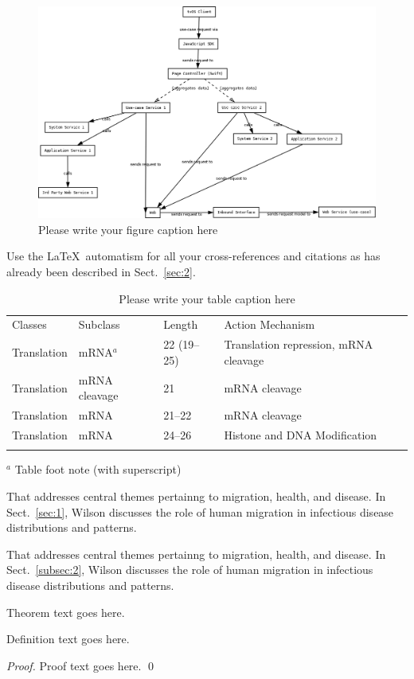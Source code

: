 \begin{figure}[t]
\sidecaption[t]
\includegraphics[scale=.20]{figure.png}
\caption{Please write your figure caption here}
\label{fig:2}       %
\end{figure}

 Use the \LaTeX\ automatism for all your cross-references and citations as has already been described in Sect.~\ref{sec:2}.

\begin{table}
\caption{Please write your table caption here}
\label{tab:1}
    \begin{tabular}{p{2cm}p{2.4cm}p{2cm}p{4.9cm}}
    \hline\noalign{\smallskip}
    Classes & Subclass & Length & Action Mechanism  \\
    \noalign{\smallskip}\svhline\noalign{\smallskip}
    Translation & mRNA$^a$  & 22 (19--25) & Translation repression, mRNA cleavage\\
    Translation & mRNA cleavage & 21 & mRNA cleavage\\
    Translation & mRNA  & 21--22 & mRNA cleavage\\
    Translation & mRNA  & 24--26 & Histone and DNA Modification\\
    \noalign{\smallskip}\hline\noalign{\smallskip}
    \end{tabular}
$^a$ Table foot note (with superscript)
\end{table}

\begin{description}[Type 1]
\item[Type 1]{That addresses central themes pertainng to migration, health, and disease. In Sect.~\ref{sec:1}, Wilson discusses the role of human migration in infectious disease distributions and patterns.}
\item[Type 2]{That addresses central themes pertainng to migration, health, and disease. In Sect.~\ref{subsec:2}, Wilson discusses the role of human migration in infectious disease distributions and patterns.}
\end{description}

\begin{theorem}
Theorem text goes here.
\end{theorem}

\begin{definition}
Definition text goes here.
\end{definition}

\begin{proof}
Proof text goes here.
\qed
\end{proof}